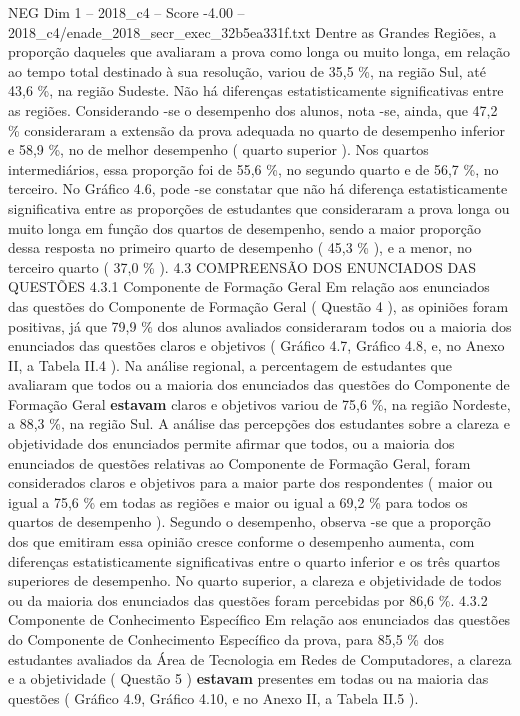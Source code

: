 \begin{textsample}{NEG Dim 1 – 2018\_c4 – Score -4.00 – 2018\_c4/enade\_2018\_secr\_exec\_32b5ea331f.txt}
Dentre as Grandes Regiões, a proporção daqueles que avaliaram a prova como longa ou muito longa, em relação ao tempo total destinado à sua resolução, variou de 35,5 \%, na região Sul, até 43,6 \%, na região Sudeste.
Não há diferenças estatisticamente significativas entre as regiões.
Considerando -se o desempenho dos alunos, nota -se, ainda, que 47,2 \% consideraram a extensão da prova adequada no quarto de desempenho inferior e 58,9 \%, no de melhor desempenho ( quarto superior ).
Nos quartos intermediários, essa proporção foi de 55,6 \%, no segundo quarto e de 56,7 \%, no terceiro.
No Gráfico 4.6, pode -se constatar que não há diferença estatisticamente significativa entre as proporções de estudantes que consideraram a prova longa ou muito longa em função dos quartos de desempenho, sendo a maior proporção dessa resposta no primeiro quarto de desempenho ( 45,3 \% ), e a menor, no terceiro quarto ( 37,0 \% ). 4.3 COMPREENSÃO DOS ENUNCIADOS DAS QUESTÕES 4.3.1 Componente de Formação Geral Em relação aos enunciados das questões do Componente de Formação Geral ( Questão 4 ), as opiniões foram positivas, já que 79,9 \% dos alunos avaliados consideraram todos ou a maioria dos enunciados das questões claros e objetivos ( Gráfico 4.7, Gráfico 4.8, e, no Anexo II, a Tabela II.4 ).
Na análise regional, a percentagem de estudantes que avaliaram que todos ou a maioria dos enunciados das questões do Componente de Formação Geral \textbf{estavam} claros e objetivos variou de 75,6 \%, na região Nordeste, a 88,3 \%, na região Sul.
A análise das percepções dos estudantes sobre a clareza e objetividade dos enunciados permite afirmar que todos, ou a maioria dos enunciados de questões relativas ao Componente de Formação Geral, foram considerados claros e objetivos para a maior parte dos respondentes ( maior ou igual a 75,6 \% em todas as regiões e maior ou igual a 69,2 \% para todos os quartos de desempenho ).
Segundo o desempenho, observa -se que a proporção dos que emitiram essa opinião cresce conforme o desempenho aumenta, com diferenças estatisticamente significativas entre o quarto inferior e os três quartos superiores de desempenho.
No quarto superior, a clareza e objetividade de todos ou da maioria dos enunciados das questões foram percebidas por 86,6 \%. 4.3.2 Componente de Conhecimento Específico Em relação aos enunciados das questões do Componente de Conhecimento Específico da prova, para 85,5 \% dos estudantes avaliados da Área de Tecnologia em Redes de Computadores, a clareza e a objetividade ( Questão 5 ) \textbf{estavam} presentes em todas ou na maioria das questões ( Gráfico 4.9, Gráfico 4.10, e no Anexo II, a Tabela II.5 ).

\end{textsample}
